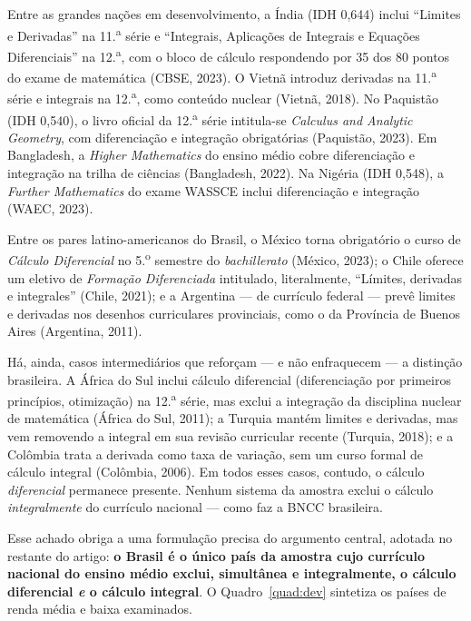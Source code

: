 \documentclass[12pt,a4paper,oneside]{article}
\begin{document}
Entre as grandes nações em desenvolvimento, a Índia (IDH 0,644) inclui
``Limites e Derivadas'' na 11.\textsuperscript{a} série e
``Integrais, Aplicações de Integrais e Equações Diferenciais'' na
12.\textsuperscript{a}, com o bloco de cálculo respondendo por 35 dos 80
pontos do exame de matemática (CBSE, 2023). O Vietnã introduz derivadas
na 11.\textsuperscript{a} série e integrais na 12.\textsuperscript{a},
como conteúdo nuclear (Vietnã, 2018). No Paquistão (IDH 0,540), o livro
oficial da 12.\textsuperscript{a} série intitula-se \emph{Calculus and
Analytic Geometry}, com diferenciação e integração obrigatórias
(Paquistão, 2023). Em Bangladesh, a \emph{Higher Mathematics} do ensino
médio cobre diferenciação e integração na trilha de ciências (Bangladesh,
2022). Na Nigéria (IDH 0,548), a \emph{Further Mathematics} do exame
WASSCE inclui diferenciação e integração (WAEC, 2023).

Entre os pares latino-americanos do Brasil, o México torna obrigatório o
curso de \emph{Cálculo Diferencial} no 5.\textsuperscript{o} semestre do
\emph{bachillerato} (México, 2023); o Chile oferece um eletivo de
\emph{Formação Diferenciada} intitulado, literalmente, ``Límites,
derivadas e integrales'' (Chile, 2021); e a Argentina --- de currículo
federal --- prevê limites e derivadas nos desenhos curriculares
provinciais, como o da Província de Buenos Aires (Argentina, 2011).

Há, ainda, casos intermediários que reforçam --- e não enfraquecem --- a
distinção brasileira. A África do Sul inclui cálculo diferencial
(diferenciação por primeiros princípios, otimização) na
12.\textsuperscript{a} série, mas exclui a integração da disciplina
nuclear de matemática (África do Sul, 2011); a Turquia mantém limites e
derivadas, mas vem removendo a integral em sua revisão curricular recente
(Turquia, 2018); e a Colômbia trata a derivada como taxa de variação, sem
um curso formal de cálculo integral (Colômbia, 2006). Em todos esses
casos, contudo, o cálculo \emph{diferencial} permanece presente. Nenhum
sistema da amostra exclui o cálculo \emph{integralmente} do currículo
nacional --- como faz a BNCC brasileira.

Esse achado obriga a uma formulação precisa do argumento central, adotada
no restante do artigo: \textbf{o Brasil é o único país da amostra cujo
currículo nacional do ensino médio exclui, simultânea e integralmente, o
cálculo diferencial \emph{e} o cálculo integral}. O Quadro~\ref{quad:dev}
sintetiza os países de renda média e baixa examinados.
\end{document}

